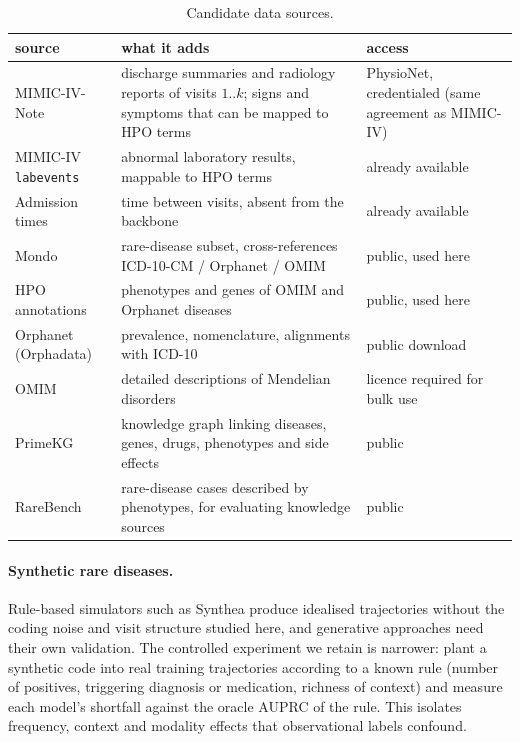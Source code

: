 \documentclass[11pt]{article}
\begin{document}
\begin{table}[H]
\centering\small
\begin{tabularx}{\linewidth}{L{3.4cm}YL{3.6cm}}
\toprule
source & what it adds & access\\
\midrule
MIMIC-IV-Note \citep{johnson2023mimicnote} & discharge summaries and radiology reports of visits $1..k$; signs and symptoms that can be mapped to HPO terms & PhysioNet, credentialed (same agreement as MIMIC-IV)\\
MIMIC-IV \texttt{labevents} & abnormal laboratory results, mappable to HPO terms & already available\\
Admission times & time between visits, absent from the backbone & already available\\
Mondo \citep{vasilevsky2026mondo} & rare-disease subset, cross-references ICD-10-CM / Orphanet / OMIM & public, used here\\
HPO annotations \citep{gargano2024hpo} & phenotypes and genes of OMIM and Orphanet diseases & public, used here\\
Orphanet (Orphadata) & prevalence, nomenclature, alignments with ICD-10 & public download\\
OMIM & detailed descriptions of Mendelian disorders & licence required for bulk use\\
PrimeKG \citep{chandak2023primekg} & knowledge graph linking diseases, genes, drugs, phenotypes and side effects & public\\
RareBench \citep{chen2024rarebench} & rare-disease cases described by phenotypes, for evaluating knowledge sources & public\\
\bottomrule
\end{tabularx}
\caption{Candidate data sources.}
\label{tab:data}
\end{table}

\paragraph{Synthetic rare diseases.} Rule-based simulators such as Synthea \citep{walonoski2018synthea} produce
idealised trajectories without the coding noise and visit structure studied here, and generative approaches
need their own validation. The controlled experiment we retain is narrower: plant a synthetic code into real
training trajectories according to a known rule (number of positives, triggering diagnosis or medication,
richness of context) and measure each model's shortfall against the oracle AUPRC of the rule. This isolates
frequency, context and modality effects that observational labels confound.
\end{document}
